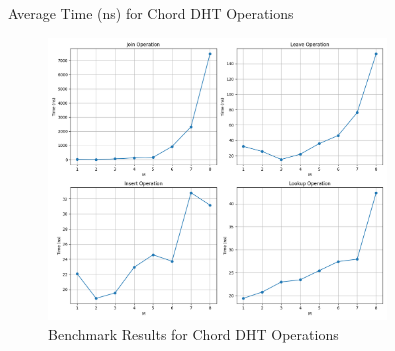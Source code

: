 \documentclass[12pt]{article}
\begin{document}
    \begin{table}[h]
        \centering
        \caption{Average Time (ns) for Chord DHT Operations}
        \label{tab:results}
    \end{table}


    \begin{figure}[h]
        \centering
        \includegraphics[width=0.8\textwidth]{chord_dht_analysis}
        \caption{Benchmark Results for Chord DHT Operations}
        \label{fig:benchmarks}
    \end{figure}
\end{document}
